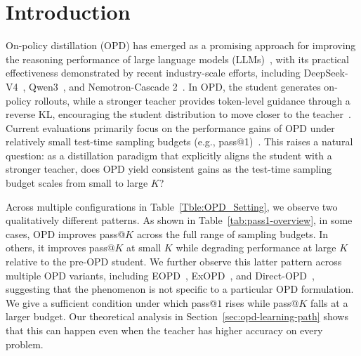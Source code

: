\documentclass{article}
\theoremstyle{opdplain}
\begin{document}
\renewcommand{\topfraction}{0.50}
\renewcommand{\dbltopfraction}{0.50}
\renewcommand{\textfraction}{0.45}
\renewcommand{\floatpagefraction}{0.70}
\setcounter{topnumber}{2}
\setcounter{dbltopnumber}{2}
\setcounter{bottomnumber}{0}
\setcounter{totalnumber}{2}

\section{Introduction}
\label{sec:introduction}

On-policy distillation (OPD) has emerged as a promising approach for improving the reasoning performance of large language models (LLMs)~\citep{agarwal2024onpolicy,song2026survey}, with its practical effectiveness demonstrated by recent industry-scale efforts, including DeepSeek-V4~\citep{xu2026deepseekv4}, Qwen3~\citep{yang2025qwen3}, and Nemotron-Cascade 2~\citep{yang2026nemotroncascade2}. In OPD, the student generates on-policy rollouts, while a stronger teacher provides token-level guidance through a reverse KL, encouraging the student distribution to move closer to the teacher~\citep{li2026rethinkingopd}. Current evaluations primarily focus on the performance gains of OPD under relatively small test-time sampling budgets (e.g., pass@1)~\citep{li2026rethinkingopd,jin2026entropyopd,yang2026exopd}. This raises a natural question: as a distillation paradigm that explicitly aligns the student with a stronger teacher, does OPD yield consistent gains as the test-time sampling budget scales from small to large $K$?

\par
Across multiple configurations in Table~\ref{Tble:OPD_Setting}, we observe two qualitatively different patterns. As shown in Table~\ref{tab:pass1-overview}, in some cases, OPD improves pass@$K$ across the full range of sampling budgets. In others, it improves pass@$K$ at small $K$ while degrading performance at large $K$ relative to the pre-OPD student. We further observe this latter pattern across multiple OPD variants, including EOPD~\citep{jin2026entropyopd}, ExOPD~\citep{yang2026exopd}, and Direct-OPD~\citep{feng2026directopd}, suggesting that the phenomenon is not specific to a particular OPD formulation. We give a sufficient condition under which pass@$1$ rises while pass@$K$ falls at a larger budget. Our theoretical analysis in Section~\ref{sec:opd-learning-path} shows that this can happen even when the teacher has higher accuracy on every problem.
\end{document}
